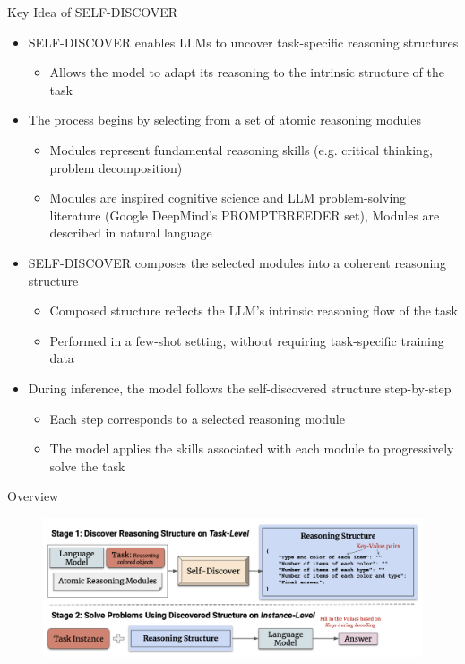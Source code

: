 \documentclass[aspectratio=169]{beamer}
\begin{document}
\begin{frame}{Key Idea of SELF-DISCOVER}
\begin{itemize}
\item SELF-DISCOVER enables LLMs to uncover task-specific reasoning structures \pause
\begin{itemize}
\item Allows the model to adapt its reasoning to the intrinsic structure of the task \pause
\end{itemize}
\item The process begins by selecting from a set of atomic reasoning modules \pause
\begin{itemize}
\item Modules represent fundamental reasoning skills (e.g. critical thinking, problem decomposition) \pause
\item Modules are inspired cognitive science and LLM problem-solving literature (Google DeepMind's PROMPTBREEDER set), Modules are described in natural language \pause
\end{itemize}
\item SELF-DISCOVER composes the selected modules into a coherent reasoning structure \pause
\begin{itemize}
\item Composed structure reflects the LLM's intrinsic reasoning flow of the task  \pause
\item Performed in a few-shot setting, without requiring task-specific training data \pause
\end{itemize}
\item During inference, the model follows the self-discovered structure step-by-step \pause
\begin{itemize}
\item Each step corresponds to a selected reasoning module \pause
\item The model applies the skills associated with each module to progressively solve the task
\end{itemize}
\end{itemize}
\end{frame}

\begin{frame}{Overview}
    \begin{figure}
    \centering
    \includegraphics[width=1\linewidth]{image002.png}
\end{figure}
\end{frame}
\end{document}
